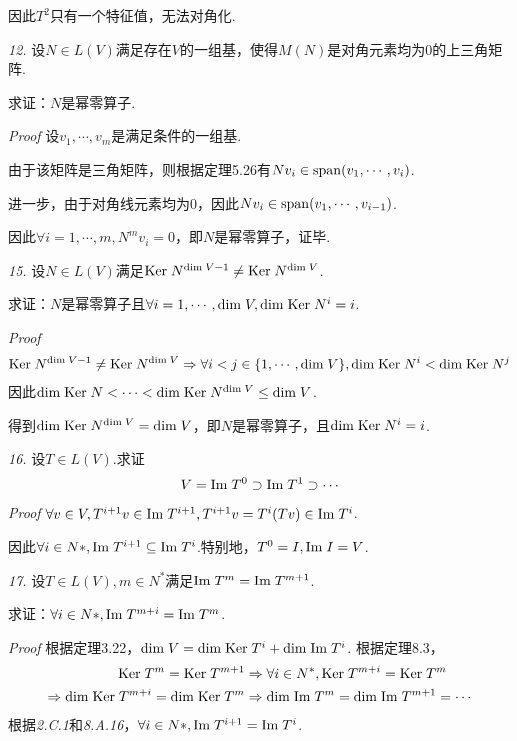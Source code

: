 因此\(T^2\)只有一个特征值，无法对角化.

\newpage

\textit{12.}
设\(N \in L(V)\)满足存在\(V\)的一组基，使得\(M(N)\)是对角元素均为\(0\)的上三角矩阵.

求证：\(N\)是幂零算子.

\textit{Proof}
设\(v_1,\cdots,v_m\)是满足条件的一组基.

由于该矩阵是三角矩阵，则根据定理5.26有\(Nv_i \in \mathrm{span} (v_1,\cdots,v_i)\).

进一步，由于对角线元素均为\(0\)，因此\(Nv_i \in \mathrm{span} (v_1,\cdots,v_{i-1})\).

因此\(\forall i=1,\cdots,m,N^m v_i=0\)，即\(N\)是幂零算子，证毕.

\hspace*{\fill}

\textit{15.}
设\(N \in L(V)\)满足\(\mathrm{Ker \;} N^{\mathrm{dim \;} V-1} \ne \mathrm{Ker \;} N^{\mathrm{dim \;} V}\).

求证：\(N\)是幂零算子且\(\forall i=1,\cdots,\mathrm{dim \;} V,\mathrm{dim \;} \mathrm{Ker \;} N^i=i\).

\textit{Proof}
    \begin{align*}
        \mathrm{Ker \;} N^{\mathrm{dim \;} V-1} \ne \mathrm{Ker \;} N^{\mathrm{dim \;} V} \Rightarrow 
        \forall i<j \in \{1,\cdots,\mathrm{dim \;} V\},\mathrm{dim \;} \mathrm{Ker \;} N^i<\mathrm{dim \;} \mathrm{Ker \;} N^j
    \end{align*}
因此\(\mathrm{dim \;} \mathrm{Ker \;} N<\cdots<\mathrm{dim \;} \mathrm{Ker \;} N^{\mathrm{dim \;} V} \leq \mathrm{dim \;} V\).

得到\(\mathrm{dim \;} \mathrm{Ker \;} N^{\mathrm{dim \;} V}=\mathrm{dim \;} V\)，即\(N\)是幂零算子，且\(\mathrm{dim \;} \mathrm{Ker \;} N^i=i\).

\hspace*{\fill}

\textit{16.}
设\(T \in L(V)\).求证
    \begin{align*}
        V=\mathrm{Im \;} T^0 \supset \mathrm{Im \;} T^1 \supset \cdots
    \end{align*}
\textit{Proof}
\(\forall v \in V,T^{i+1}v \in \mathrm{Im \;} T^{i+1},T^{i+1}v=T^i(Tv) \in \mathrm{Im \;} T^i\).

因此\(\forall i \in N*,\mathrm{Im \;} T^{i+1} \subseteq \mathrm{Im \;} T^i\).特别地，\(T^0=I,\mathrm{Im \;} I=V\).

\hspace*{\fill}

\textit{17.}
设\(T \in L(V),m \in N^*\)满足\(\mathrm{Im \;} T^m=\mathrm{Im \;} T^{m+1}\).

求证：\(\forall i \in N*,\mathrm{Im \;} T^{m+i}=\mathrm{Im \;} T^m\).

\textit{Proof}
根据定理3.22，\(\mathrm{dim \;} V=\mathrm{dim \;} \mathrm{Ker \;} T^i+\mathrm{dim \;} \mathrm{Im \;} T^i\).
根据定理8.3，
    \begin{align*}
        \mathrm{Ker \;} T^m=\mathrm{Ker \;} T^{m+1} &\Rightarrow \forall i \in N^*,\mathrm{Ker \;} T^{m+i}=\mathrm{Ker \;} T^m \\
        \Rightarrow \mathrm{dim \;} \mathrm{Ker \;} T^{m+i}=\mathrm{dim \;} \mathrm{Ker \;} T^m
        &\Rightarrow \mathrm{dim \;} \mathrm{Im \;} T^m=\mathrm{dim \;} \mathrm{Im \;} T^{m+1}=\cdots
    \end{align*}
根据\textit{2.C.1}和\textit{8.A.16}，\(\forall i \in N*,\mathrm{Im \;} T^{i+1}=\mathrm{Im \;} T^i\).

